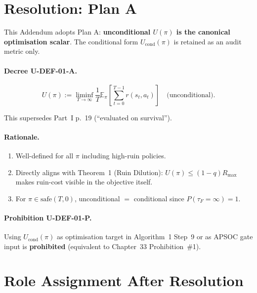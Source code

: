 \section{Resolution: Plan A}
\label{sec:u-def-01-resolution}

This Addendum adopts Plan A: \textbf{unconditional $U(\pi)$ is the
canonical optimisation scalar}. The conditional form
$U_{\mathrm{cond}}(\pi)$ is retained as an audit metric only.

\paragraph{Decree U-DEF-01-A.}

\begin{equation}
U(\pi) := \liminf_{T \to \infty}
\frac{1}{T} \mathbb{E}_\pi\!\left[
\sum_{t=0}^{T-1} r(s_t, a_t)
\right]
\quad \text{(unconditional)}.
\label{eq:u-def-01-canonical}
\end{equation}

This supersedes Part~I p.~19 (``evaluated on survival'').

\paragraph{Rationale.}

\begin{enumerate}
\item Well-defined for all $\pi$ including high-ruin policies.
\item Directly aligns with Theorem~1 (Ruin Dilution): $U(\pi) \le
(1 - q) R_{\max}$ makes ruin-cost visible in the objective itself.
\item For $\pi \in \mathrm{safe}(T, 0)$, unconditional $=$
conditional since $P(\tau_F = \infty) = 1$.
\end{enumerate}

\paragraph{Prohibition U-DEF-01-P.}
Using $U_{\mathrm{cond}}(\pi)$ as optimisation target in Algorithm~1
Step~9 or as APSOC gate input is \textbf{prohibited}
(equivalent to Chapter~33 Prohibition~\#1).

\section{Role Assignment After Resolution}
\label{sec:u-def-01-role-assignment}


